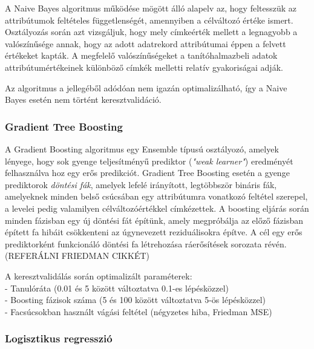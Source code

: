 \documentclass[12pt]{article}
\begin{document}
A Naive Bayes algoritmus működése mögött álló alapelv az, hogy feltesszük az attribútumok feltételes függetlenségét, amennyiben a célváltozó értéke ismert. Osztályozás során azt vizsgáljuk, hogy mely címkeérték mellett a legnagyobb a valószínűsége annak, hogy az adott adatrekord attribútumai éppen a felvett értékeket kapták. A megfelelő valószínűségeket a tanítóhalmazbeli adatok attribútumértékeinek különböző címkék melletti relatív gyakoriságai adják. 

Az algoritmus a jellegéből adódóan nem igazán optimalizálható, így a Naive Bayes esetén nem történt keresztvalidáció.

\subsubsection{Gradient Tree Boosting}

A Gradient Boosting algoritmus egy Ensemble típusú osztályozó, amelyek lényege, hogy sok gyenge teljesítményű prediktor (\textit{"weak learner"}) eredményét felhasználva hoz egy erős predikciót. Gradient Tree Boosting esetén a gyenge prediktorok \textit{döntési fák}, amelyek lefelé irányított, legtöbbször bináris fák, amelyeknek minden belső csúcsában egy attribútumra vonatkozó feltétel szerepel, a levelei pedig valamilyen célváltozóértékkel címkézettek. A boosting eljárás során minden fázisban egy új döntési fát építünk, amely megpróbálja az előző fázisban épített fa hibáit csökkenteni az úgynevezett reziduálisokra építve. A cél egy erős prediktorként funkcionáló döntési fa létrehozása ráerősítések sorozata révén. (REFERÁLNI FRIEDMAN CIKKÉT)



A keresztvalidálás során optimalizált paraméterek: \\
- Tanulóráta (0.01 és 5 között változtatva 0.1-es lépésközzel)\\
- Boosting fázisok száma (5 és 100 között változtatva 5-ös lépésközzel)\\
- Facsúcsokban használt vágási feltétel (négyzetes hiba, Friedman MSE) \\

\subsubsection{Logisztikus regresszió}
\end{document}

